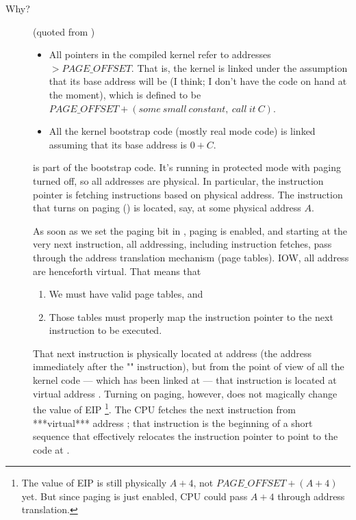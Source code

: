 \begin{description}
\item[Why?] (quoted from \cite[Sec 1.3.2]{abhishek2002memory})
  \begin{itemize}
  \item All pointers in the compiled kernel refer to addresses $> PAGE\_OFFSET$. That is,
    the kernel is linked under the assumption that its base address will be
     (I think; I don't have the code on hand at the moment), which is
    defined to be $PAGE\_OFFSET+(some\ small\ constant,\ call\ it\ C)$.
  \item All the kernel bootstrap code (mostly real mode code) is linked assuming that its
    base address is $0+C$.
  \end{itemize}

   is part of the bootstrap code. It's running in protected mode with paging
  turned off, so all addresses are physical. In particular, the instruction pointer is
  fetching instructions based on physical address. The instruction that turns on paging
  () is located, say, at some physical address $A$.

  As soon as we set the paging bit in , paging is enabled, and starting at the very
  next instruction, all addressing, including instruction fetches, pass through the
  address translation mechanism (page tables). IOW, all address are henceforth
  virtual. That means that
  \begin{enumerate}
  \item We must have valid page tables, and
  \item Those tables must properly map the instruction pointer to the next instruction to
    be executed.
  \end{enumerate}
  That next instruction is physically located at address  (the address
  immediately after the "" instruction), but from the point of view
  of all the kernel code --- which has been linked at  --- that
  instruction is located at virtual address . Turning on paging,
  however, does not magically change the value of EIP \footnote{The value of EIP is still
    physically $A+4$, not $PAGE\_OFFSET+(A+4)$ yet. But since paging is just enabled, CPU
    could pass $A+4$ through address translation.}.  The CPU fetches the next instruction
  from ***virtual*** address ; that instruction is the beginning of a short
  sequence that effectively relocates the instruction pointer to point to the code at
  .


\end{description}
